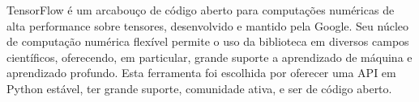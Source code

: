 TensorFlow é um arcabouço de código aberto para computações numéricas de alta performance sobre tensores, desenvolvido e mantido pela Google.
Seu núcleo de computação numérica flexível permite o uso da biblioteca em diversos campos científicos, oferecendo, em particular, grande suporte a aprendizado de máquina e aprendizado profundo.
Esta ferramenta foi escolhida por oferecer uma API em Python estável, ter grande suporte, comunidade ativa, e ser de código aberto.


%


